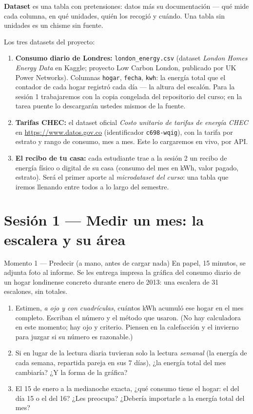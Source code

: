\documentclass[12pt,letterpaper]{article}
\begin{document}
\textbf{Dataset} es una tabla con pretensiones: datos más su documentación --- qué mide cada columna, en qué unidades, quién los recogió y cuándo. Una tabla sin unidades es un chisme sin fuente.

Los tres datasets del proyecto:
\begin{enumerate}[label=\arabic*., itemsep=0.15em]
    \item \textbf{Consumo diario de Londres:} \texttt{london\_energy.csv} (dataset \emph{London Homes Energy Data} en Kaggle; proyecto Low Carbon London, publicado por UK Power Networks). Columnas \texttt{hogar}, \texttt{fecha}, \texttt{kwh}: la energía total que el contador de cada hogar registró cada día --- la altura del escalón. Para la sesión 1 trabajaremos con la copia congelada del repositorio del curso; en la tarea puente lo descargarán ustedes mismos de la fuente.
    \item \textbf{Tarifas CHEC:} el dataset oficial \emph{Costo unitario de tarifas de energía CHEC} en \url{https://www.datos.gov.co} (identificador \texttt{c698-wqig}), con la tarifa por estrato y rango de consumo, mes a mes. Este lo cargaremos en vivo, por API.
    \item \textbf{El recibo de tu casa:} cada estudiante trae a la sesión 2 un recibo de energía físico o digital de su casa (consumo del mes en kWh, valor pagado, estrato). Será el primer aporte al \emph{microdataset del curso}: una tabla que iremos llenando entre todos a lo largo del semestre.
\end{enumerate}

\section{Sesión 1 --- Medir un mes: la escalera y su área}

\begin{cajaprediccion}{Momento 1 --- Predecir (a mano, antes de cargar nada)}
En papel, 15 minutos, se adjunta foto al informe. Se les entrega impresa la gráfica del consumo diario de un hogar londinense concreto durante enero de 2013: una escalera de 31 escalones, sin totales.
\begin{enumerate}[label=P\arabic*., itemsep=0.1em]
    \item Estimen, \emph{a ojo y con cuadrículas}, cuántos kWh acumuló ese hogar en el mes completo. Escriban el número y el método que usaron. (No hay calculadora en este momento; hay ojo y criterio. Piensen en la calefacción y el invierno para juzgar si su número es razonable.)
    \item Si en lugar de la lectura diaria tuvieran solo la lectura \emph{semanal} (la energía de cada semana, repartida pareja en sus 7 días), ¿la energía total del mes cambiaría? ¿Y la forma de la gráfica?
    \item El 15 de enero a la medianoche exacta, ¿qué consumo tiene el hogar: el del día 15 o el del 16? ¿Les preocupa? ¿Debería importarle a la energía total del mes?
\end{enumerate}
\end{cajaprediccion}
\end{document}
